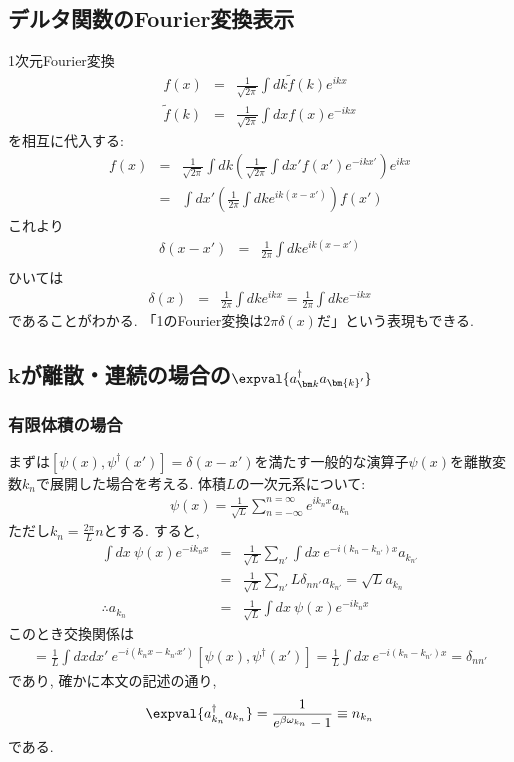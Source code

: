 \documentclass[10.5pt,a4paper]{jreport}
\begin{document}
\subsection{デルタ関数のFourier変換表示}
1次元Fourier変換
\begin{eqnarray}
  f(x) &=& \frac{1}{\sqrt{2\pi}}\int dk \tilde{f}(k)e^{ikx}\\
  \tilde{f}(k) &=& \frac{1}{\sqrt{2\pi}}\int dx f(x)e^{-ikx}
\end{eqnarray}
を相互に代入する:
\begin{eqnarray}
  f(x) &=& \frac{1}{\sqrt{2\pi}}\int dk \left(\frac{1}{\sqrt{2\pi}}\int dx' f(x')e^{-ikx'}\right)e^{ikx}\\
  &=& \int dx' \left(\frac{1}{2\pi}\int dk e^{ik(x-x')}\right)f(x')
\end{eqnarray}
これより
\begin{eqnarray}
  \delta(x-x') &=& \frac{1}{2\pi}\int dk e^{ik(x-x')}\\
\end{eqnarray}
ひいては
\begin{eqnarray}
  \delta(x) &=& \frac{1}{2\pi}\int dk e^{ikx} = \frac{1}{2\pi}\int dk e^{-ikx}
\end{eqnarray}
であることがわかる. 「1のFourier変換は$2\pi\delta(x)$だ」という表現もできる. 
\subsection{$\bm{k}$が離散・連続の場合の$\expval{a_{\bm k}^\dagger a_{\bm{k}'}}$}
\subsubsection{有限体積の場合}
まずは$\left[\psi(x), \psi^\dagger(x')\right] = \delta(x - x')$を満たす一般的な演算子$\psi(x)$を離散変数$k_n$で展開した場合を考える. 体積$L$の一次元系について:
\begin{eqnarray}
  \psi(x) = \frac{1}{\sqrt{L}}\sum_{n=-\infty}^{n=\infty}e^{ik_nx}a_{k_n}
\end{eqnarray}
ただし$k_n = \frac{2\pi}{L}n$とする. すると,
\begin{eqnarray}
  \int dx\ \psi(x)e^{-ik_nx} &=& \frac{1}{\sqrt{L}}\sum_{n'}\int dx\ e^{-i(k_n-k_{n'})x}a_{k_{n'}}\\
  &=& \frac{1}{\sqrt{L}}\sum_{n'}L\delta_{nn'}a_{k_{n'}} = \sqrt{L}a_{k_n}\\
  \therefore a_{k_n} &=& \frac{1}{\sqrt{L}}\int dx\ \psi(x)e^{-ik_nx}  
\end{eqnarray}
このとき交換関係は
\begin{eqnarray}
  [a_{k_n}, a^\dagger_{k_{n'}}] = \frac{1}{L}\int dx dx'\ e^{-i(k_nx - k_{n'}x')}\left[\psi(x), \psi^\dagger(x')\right] = \frac{1}{L}\int dx \ e^{-i(k_n - k_{n'})x} = \delta_{nn'}
\end{eqnarray}
であり, 確かに本文の記述の通り,
\begin{eqnarray}
  \expval{a_{k_n}^\dagger a_{k_n}} = \frac{1}{e^{\beta\omega_{k_n}}-1} \equiv n_{k_n}
\end{eqnarray}
である.
\end{document}
